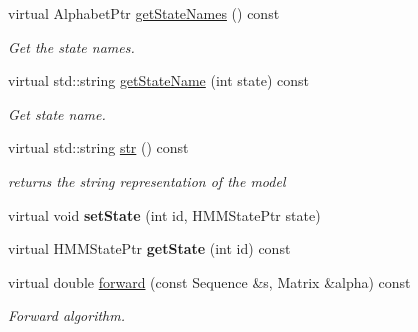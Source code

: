 \begin{DoxyCompactItemize}
\mbox{\label{classtops_1_1HiddenMarkovModel_a97718c6f22b668611692902c561b6fac}} 
virtual Alphabet\+Ptr \hyperlink{classtops_1_1HiddenMarkovModel_a97718c6f22b668611692902c561b6fac}{get\+State\+Names} () const
\begin{DoxyCompactList}\small\item\em Get the state names. \end{DoxyCompactList}\item 
\mbox{\label{classtops_1_1HiddenMarkovModel_aab4bbb731e757d8e5d0cc1e660f45e63}} 
virtual std\+::string \hyperlink{classtops_1_1HiddenMarkovModel_aab4bbb731e757d8e5d0cc1e660f45e63}{get\+State\+Name} (int state) const
\begin{DoxyCompactList}\small\item\em Get state name. \end{DoxyCompactList}\item 
\mbox{\label{classtops_1_1HiddenMarkovModel_a26a70987f5b4b2acd119c01f7e986f6c}} 
virtual std\+::string \hyperlink{classtops_1_1HiddenMarkovModel_a26a70987f5b4b2acd119c01f7e986f6c}{str} () const
\begin{DoxyCompactList}\small\item\em returns the string representation of the model \end{DoxyCompactList}\item 
\mbox{\label{classtops_1_1HiddenMarkovModel_ab77bfeacc3fa135abbf82d6f9887607e}} 
virtual void {\bfseries set\+State} (int id, H\+M\+M\+State\+Ptr state)
\item 
\mbox{\label{classtops_1_1HiddenMarkovModel_a3b84fee9e3f217c59a721072ab74167f}} 
virtual H\+M\+M\+State\+Ptr {\bfseries get\+State} (int id) const
\item 
\mbox{\label{classtops_1_1HiddenMarkovModel_aea7c39ddeb051ec95cc7c745e719af35}} 
virtual double \hyperlink{classtops_1_1HiddenMarkovModel_aea7c39ddeb051ec95cc7c745e719af35}{forward} (const Sequence \&s, Matrix \&alpha) const
\begin{DoxyCompactList}\small\item\em Forward algorithm. \end{DoxyCompactList}\item 

\end{DoxyCompactItemize}
